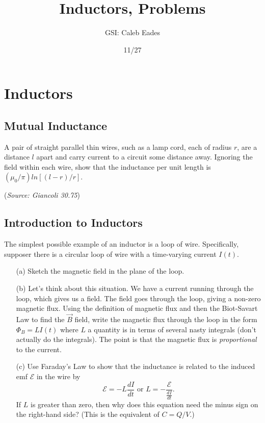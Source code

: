 \documentclass{article}
\begin{document}
\title{Inductors, Problems}
\author{GSI: Caleb Eades}
\date{11/27}
\maketitle

\section{Inductors}

\subsection{Mutual Inductance}

A pair of straight parallel thin wires, such as a lamp cord, each of radius $r$, are a distance $l$ apart and carry current to a circuit some distance away. Ignoring the field within each wire, show that the inductance per unit length is $(\mu_0/\pi)ln[(l-r)/r]$.

(\textit{Source: Giancoli 30.75})

\subsection{Introduction to Inductors}

The simplest possible example of an inductor is a loop of wire. Specifically, supposer there is a circular loop of wire with a time-varying current $I(t)$.
\begin{itemize}
	\item[(a)] Sketch the magnetic field in the plane of the loop.
	\item[(b)] Let's think about this situation. We have a current running through the loop, which gives us a field. The field goes through the loop, giving a non-zero magnetic flux. Using the definition of magnetic flux and then the Biot-Savart Law to find the $\vec{B}$ field, write the magnetic flux through the loop in the form
	$\Phi_B = L I(t)$
	where $L$ a quantity is in terms of several nasty integrals (don't actually do the integrals). The point is that the magnetic flux is \textit{proportional} to the current.
	\item[(c)] Use Faraday's Law to show that the inductance is related to the induced emf $\mathcal{E}$ in the wire by
	\begin{equation}
	\mathcal{E} = - L \frac{dI}{dt} \text{ or }L = - \frac{\mathcal{E}}{\frac{dI}{dt}}.
	\label{eq:inductor}
	\end{equation}
	If $L$ is greater than zero, then why does this equation need the minus sign on the right-hand side? (This is the equivalent of $C = Q/V$.) 
\end{itemize}
\end{document}

